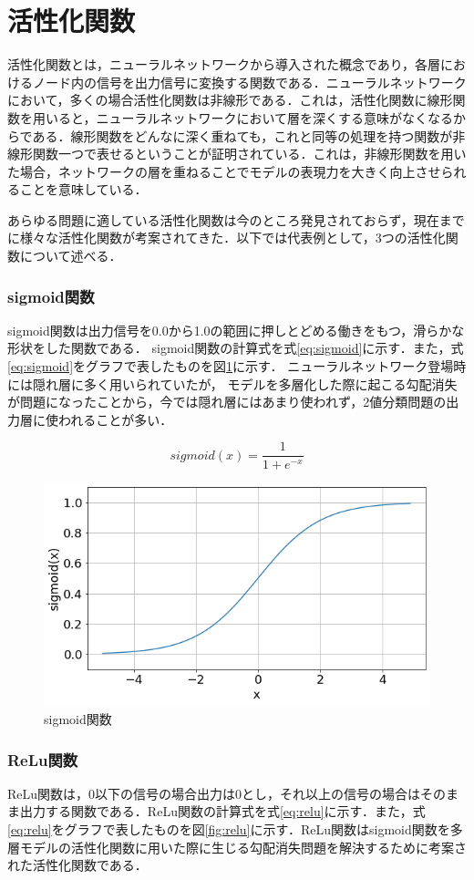 \documentclass[a4j, 11pt]{jreport}
\begin{document}
\section{活性化関数}
活性化関数とは，ニューラルネットワークから導入された概念であり，各層におけるノード内の信号を出力信号に変換する関数である．ニューラルネットワークにおいて，多くの場合活性化関数は非線形である．これは，活性化関数に線形関数を用いると，ニューラルネットワークにおいて層を深くする意味がなくなるからである．線形関数をどんなに深く重ねても，これと同等の処理を持つ関数が非線形関数一つで表せるということが証明されている．これは，非線形関数を用いた場合，ネットワークの層を重ねることでモデルの表現力を大きく向上させられることを意味している．

あらゆる問題に適している活性化関数は今のところ発見されておらず，現在までに様々な活性化関数が考案されてきた．以下では代表例として，3つの活性化関数について述べる．
\subsubsection{sigmoid関数}
sigmoid関数は出力信号を0.0から1.0の範囲に押しとどめる働きをもつ，滑らかな形状をした関数である．
sigmoid関数の計算式を式\ref{eq:sigmoid}に示す．また，式\ref{eq:sigmoid}をグラフで表したものを図\ref{fig:sigmoid}に示す．
ニューラルネットワーク登場時には隠れ層に多く用いられていたが，
モデルを多層化した際に起こる勾配消失が問題になったことから，今では隠れ層にはあまり使われず，2値分類問題の出力層に使われることが多い．

\begin{equation}
 sigmoid(x) = \frac{1}{1 + e^{-x}}
 \label{eq:sigmoid}
\end{equation}

\begin{figure}[H]
 \centering
 \includegraphics[width=0.7\hsize, keepaspectratio]{images/sigmoid.png}
 \caption{sigmoid関数}
 \label{fig:sigmoid}
\end{figure}

\subsubsection{ReLu関数}
ReLu関数\cite{Glorot2011}は，0以下の信号の場合出力は0とし，それ以上の信号の場合はそのまま出力する関数である．ReLu関数の計算式を式\ref{eq:relu}に示す．また，式\ref{eq:relu}をグラフで表したものを図\ref{fig:relu}に示す．ReLu関数はsigmoid関数を多層モデルの活性化関数に用いた際に生じる勾配消失問題を解決するために考案された活性化関数である．
\end{document}
